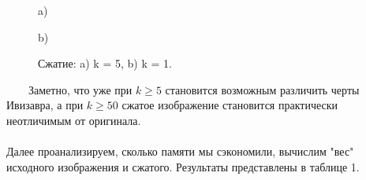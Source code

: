 \documentclass[a5paper, 10pt]{article}
\theoremstyle{definition}
\theoremstyle{plain}
\theoremstyle{remark}
\begin{document}
\begin{figure}[h]
\begin{minipage}[h]{1\linewidth}
 a) \\
\end{minipage}
\begin{minipage}[h]{1\linewidth}
 b) \\
\end{minipage}
\caption{Сжатие: a) k = 5, b) k = 1.}
\end{figure}
\newpage
\,
\newpage
\,
\newpage
\,
\newpage
\,
\newpage
Заметно, что уже при $k \geq 5$ становится возможным различить черты Ивизавра, а при $k \geq 50$ сжатое изображение становится практически неотличимым от оригинала.\\
\\
Далее проанализируем, сколько памяти мы сэкономили, вычислим "вес" исходного изображения и сжатого. Результаты представлены в таблице 1.
\newpage
\end{document}
